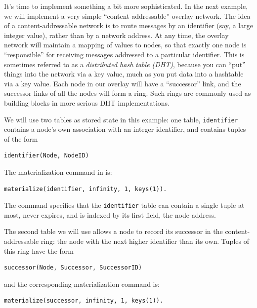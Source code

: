 \documentclass{article}
\begin{document}
It's time to implement something a bit more sophisticated.  In the next
example, we will implement a very simple ``content-addressable'' overlay
network.  The idea of a content-addressable network is to route messages
by an identifier (say, a large integer value), rather than by a network
address.  At any time, the overlay network will maintain a mapping of
values to nodes, so that exactly one node is ``responsible'' for
receiving messages addressed to a particular identifier.  This is
sometimes referred to as a {\em distributed hash table (DHT)}, because
you can ``put'' things into the network via a key value, much as you put
data into a hashtable via a key value.  Each node in our overlay will
have a ``successor'' link, and the successor links of all the nodes will
form a ring.  Such rings are commonly used as building blocks in more
serious DHT implementations.

We will use two tables as stored state in this example: one table,
\lstinline$identifier$ contains a node's own association with an
integer identifier, and contains tuples of the form
\begin{lstlisting}
identifier(Node, NodeID)
\end{lstlisting}
The materialization command in \ol is:
\begin{lstlisting}
materialize(identifier, infinity, 1, keys(1)).
\end{lstlisting}
The command specifies that the \lstinline$identifier$ table can contain
a single tuple at most, never expires, and is indexed by its first
field, the node address.

The second table we will use allows a node to record its successor in
the content-addressable ring: the node with the next higher identifier
than its own. Tuples of this ring have the form
\begin{lstlisting}
successor(Node, Successor, SuccessorID)
\end{lstlisting}
and the corresponding materialization command is:
\begin{lstlisting}
materialize(successor, infinity, 1, keys(1)).
\end{lstlisting}
\end{document}
